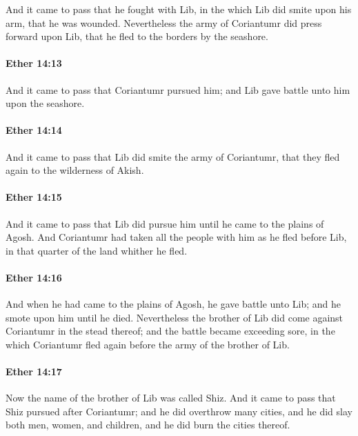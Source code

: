 			And it came to pass that he fought with Lib,
			in the which Lib did smite upon his arm, that he was wounded.
			Nevertheless the army of Coriantumr did press forward upon Lib,
			that he fled to the borders by the seashore.

		\paragraph{Ether 14:13} %
			\label{ETHER-14-13}

			And it came to pass that Coriantumr pursued him;
			and Lib gave battle unto him upon the seashore.

		\paragraph{Ether 14:14} %
			\label{ETHER-14-14}

			And it came to pass that Lib did smite the army of Coriantumr,
			that they fled again to the wilderness of Akish.

		\paragraph{Ether 14:15} %
			\label{ETHER-14-15}

			And it came to pass that Lib did pursue him
			until he came to the plains of Agosh.
			And Coriantumr had taken all the people with him as he fled before Lib,
			in that quarter of the land whither he fled.

		\paragraph{Ether 14:16} %
			\label{ETHER-14-16}

			And when he had came to the plains of Agosh, he gave battle unto Lib;
			and he smote upon him until he died.
			Nevertheless the brother of Lib did come against Coriantumr in the stead thereof;
			and the battle became exceeding sore,
			in the which Coriantumr fled again before the army of the brother of Lib.

		\paragraph{Ether 14:17} %
			\label{ETHER-14-17}

			Now the name of the brother of Lib was called Shiz.
			And it came to pass that Shiz pursued after Coriantumr;
			and he did overthrow many cities,
			and he did slay both men, women, and children,
			and he did burn the cities thereof.

